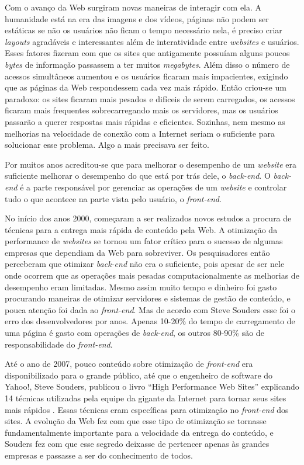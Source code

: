Com o avanço da Web surgiram novas maneiras de interagir com ela. A humanidade está na era das imagens e dos vídeos, páginas não podem ser estáticas se não os usuários não ficam o tempo necessário nela, é preciso criar \textit{layouts} agradáveis e interessantes além de interatividade entre \textit{websites} e usuários. Esses fatores fizeram com que os sites que antigamente possuíam alguns poucos \textit{bytes} de informação passassem a ter muitos \textit{megabytes}. Além disso o número de acessos simultâneos aumentou e os usuários ficaram mais impacientes, exigindo que as páginas da Web respondessem cada vez mais rápido. Então criou-se um paradoxo: os sites ficaram mais pesados e difíceis de serem carregados, os acessos ficaram mais frequentes sobrecarregando mais os servidores, mas os usuários passarão a querer respostas mais rápidas e eficientes. Sozinhas, nem mesmo as melhorias na velocidade de conexão com a Internet seriam o suficiente para solucionar esse problema. Algo a mais precisava ser feito.

Por muitos anos acreditou-se que para melhorar o desempenho de um \textit{website} era suficiente melhorar o desempenho do que está por trás dele, o \textit{back-end}. O \textit{back-end} é a parte responsável por gerenciar as operações de um \textit{website} e controlar tudo o que acontece na parte vista pelo usuário, o \textit{front-end}.

No início dos anos 2000, começaram a ser realizados novos estudos a procura de técnicas para a entrega mais rápida de conteúdo pela Web. A otimização da performance de \textit{websites} se tornou um fator crítico para o sucesso de algumas empresas que dependiam da Web para sobreviver. Os pesquisadores então perceberam que otimizar  \textit{back-end} não era o suficiente, pois apesar de ser nele onde ocorrem que as operações mais pesadas computacionalmente as melhorias de desempenho eram limitadas. Mesmo assim muito tempo e dinheiro foi gasto procurando maneiras de otimizar servidores e sistemas de gestão de conteúdo, e pouca atenção foi dada ao \textit{front-end}. Mas de acordo com Steve Souders \cite{HighPerformanceWebSites} esse foi o erro dos desenvolvedores por anos. Apenas 10-20\% do tempo de carregamento de uma página é gasto com operações de \textit{back-end}, os outros 80-90\% são de responsabilidade do \textit{front-end}.

Até o ano de 2007, pouco conteúdo sobre otimização de \textit{front-end} era disponibilizado para o grande público, até que o engenheiro de software do Yahoo!, Steve Souders, publicou o livro “High Performance Web Sites” explicando 14 técnicas utilizadas pela equipe da gigante da Internet para tornar seus sites mais rápidos \cite{HighPerformanceWebSites}. Essas técnicas eram específicas para otimização no \textit{front-end} dos sites. A evolução da Web fez com que esse tipo de otimização se tornasse fundamentalmente importante para a velocidade da entrega do conteúdo, e Souders fez com que esse segredo deixasse de pertencer apenas às grandes empresas e passasse a ser do conhecimento de todos.


